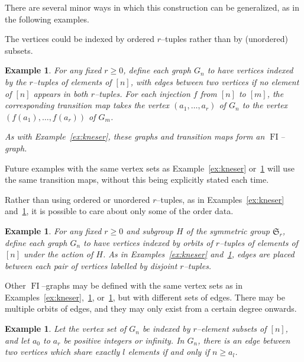 \documentclass[10pt]{amsart}
\DeclareMathOperator{\FI}{FI}
\newcommand{\Sn}{\mathfrak{S}}
\newtheorem{example}[theorem]{Example}
\theoremstyle{definition}
\begin{document}
There are several minor ways in which this construction can be generalized, as in the following examples. 

The vertices could be indexed by ordered $r$--tuples rather than by (unordered) subsets.

\begin{example}\label{ex:kneserordered}
For any fixed $r \geq 0$, define each graph $G_{n}$ to have vertices indexed by the $r$--tuples of elements of $[n]$, with edges between two vertices if no element of $[n]$ appears in both $r$--tuples. For each injection $f$ from $[n]$ to $[m]$, the corresponding transition map takes the vertex $(a_1,\dots,a_r)$ of $G_n$ to the vertex $(f(a_1),\dots,f(a_r))$ of $G_m$.

As with Example~\ref{ex:kneser}, these graphs and transition maps form an $\FI$--graph. 
\end{example}

Future examples with the same vertex sets as Example~\ref{ex:kneser} or~\ref{ex:kneserordered} will use the same transition maps, without this being explicitly stated each time.

Rather than using ordered or unordered $r$--tuples, as in Examples~\ref{ex:kneser} and~\ref{ex:kneserordered}, it is possible to care about only some of the order data.

\begin{example}\label{ex:kneserpartordered}
For any fixed $r \geq 0$ and subgroup $H$ of the symmetric group $\Sn_r$, define each graph $G_{n}$ to have vertices indexed by orbits of $r$--tuples of elements of $[n]$ under the action of $H$. As in Examples~\ref{ex:kneser} and~\ref{ex:kneserordered}, edges are placed between each pair of vertices labelled by disjoint $r$--tuples.
\end{example}

Other $\FI$--graphs may be defined with the same vertex sets as in Examples~\ref{ex:kneser},~\ref{ex:kneserordered}, or~\ref{ex:kneserpartordered}, but with different sets of edges. There may be multiple orbits of edges, and they may only exist from a certain degree onwards.

\begin{example}\label{ex:kneseredgeorbits}
Let the vertex set of $G_n$ be indexed by $r$--element subsets of $[n]$, and let $a_0$ to $a_r$ be positive integers or infinity. In $G_n$, there is an edge between two vertices which share exactly $l$ elements if and only if $n \geq a_l$. 
\end{example}
\end{document}
